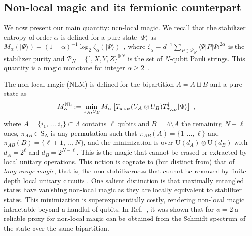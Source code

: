 \documentclass[prx,twocolumn,superscriptaddress,aps,10pt, frontmatterverbose, reprint,footinbib,longbibliography=true]{revtex4-2}
\newcommand{\RENYI}{\alpha}
\begin{document}
\subsection{Non-local magic and its fermionic counterpart}
We now present our main quantity: non-local magic.
We recall that the stabilizer entropy of order $\RENYI$ is defined for a pure state $|\Psi\rangle$ as $M_\RENYI(|\Psi\rangle)=(1-\RENYI)^{-1}\log_2 \zeta_\RENYI(|\Psi\rangle)$~\cite{Leone2022SRE}, where $\zeta_\RENYI= d^{-1}\sum_{P\in \mathcal{P}_N} \langle \Psi|P|\Psi\rangle^{2\RENYI}$ is the stabilizer purity and $\mathcal{P}_N=\{ \mathbb{I},X,Y,Z\}^{\otimes N}$  is the set of $N$-qubit Pauli strings. This quantity is a magic monotone for integer $\RENYI\ge 2$~\cite{piro,leone2024stabilizer}.

The non-local magic (NLM) is defined for the bipartition $\Lambda = A\sqcup B$ and a pure state as 
\begin{equation}
    M_\RENYI^\textup{NL}:= \min_{U_A , U_B} M_\RENYI\left[T_{\pi_{AB}} (U_A\otimes U_B)T_{\pi_{AB}}^\dagger|\Psi\rangle\right]\;,\label{eq:defNLmagic}
\end{equation}
where $A=\{i_1,\dots,i_\ell\}\subset \Lambda$ contains $\ell$ qubits and $B=\Lambda\setminus A$ the remaining $N-\ell$ ones, $\pi_{AB}\in \mathrm{S}_N$ is any permutation such that $\pi_{AB}(A)=\{1,\dots,\ell\}$ and $\pi_{AB}(B)=\{\ell+1,\dots, N\}$, and the minimization is over $\mathrm{U}(d_A)\otimes \mathrm{U}(d_B)$ with $d_A=2^{\ell}$ and $d_B = 2^{N-\ell}$. This is the magic that cannot be erased or extracted by local unitary operations. This notion is cognate to (but distinct from) that of {\em long-range magic}, that is, the non-stabilizerness that cannot be removed by finite-depth local unitary circuits \cite{Korbany2025}. One salient distinction is that maximally entangled states have vanishing non-local magic as they are locally equivalent to stabilizer states.
This minimization is superexponentially costly, rendering non-local magic intractable beyond a handful of qubits.
In Ref.~\cite{Cao_2025}, it was shown that for $\RENYI = 2$ a reliable proxy for non-local magic can be obtained from the Schmidt spectrum of the state over the same bipartition.
\end{document}
